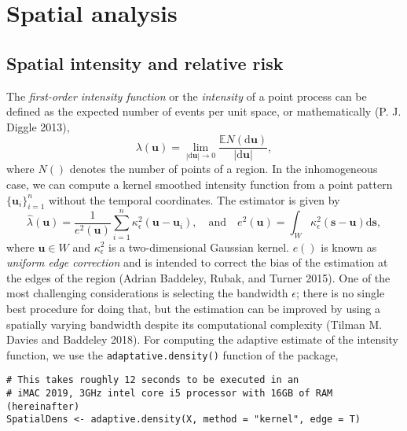 \hypertarget{spatial-analysis}{%
\section{Spatial analysis}\label{spatial-analysis}}

\hypertarget{sectionintensity}{%
\subsection{Spatial intensity and relative risk}\label{sectionintensity}}

The \emph{first-order intensity function} or the \emph{intensity} of a point process can be defined as the expected number of events per unit space, or mathematically (P. J. Diggle 2013),
\[
\lambda(\mathbf{u})=\lim_{|\text{d}\mathbf{u}|\rightarrow 0}\frac{\mathbb{E}N(\text{d}\mathbf{u})}{|\text{d}\mathbf{u}|},
\]
where \(N()\) denotes the number of points of a region. In the inhomogeneous case, we can compute a kernel smoothed intensity function from a point pattern \(\{\mathbf{u}_i\}_{i=1}^n\) without the temporal coordinates. The estimator is given by
\begin{equation}
    \hat{\lambda}(\mathbf{u})=\frac{1}{e^2(\mathbf{u})}\sum_{i=1}^{n}\kappa_{\epsilon}^{2}(\mathbf{u}-\mathbf{u}_i), \quad \text{and} \quad e^2(\mathbf{u})=\int_{W} \kappa_{\epsilon}^{2}(\mathbf{s}-\mathbf{u}) \text{d} \mathbf{s},
    \label{eq:lambdaspatial}
\end{equation}
where \(\mathbf{u}\in W\) and \(\kappa_{\epsilon}^{2}\) is a two-dimensional Gaussian kernel. \(e()\) is known as \emph{uniform edge correction} and is intended to correct the bias of the estimation at the edges of the region (Adrian Baddeley, Rubak, and Turner 2015). One of the most challenging considerations is selecting the bandwidth \(\epsilon\); there is no single best procedure for doing that, but the estimation can be improved by using a spatially varying bandwidth despite its computational complexity (Tilman M. Davies and Baddeley 2018). For computing the adaptive estimate of the intensity function, we use the \texttt{adaptative.density()} function of the  package,

\begin{verbatim}
# This takes roughly 12 seconds to be executed in an
# iMAC 2019, 3GHz intel core i5 processor with 16GB of RAM (hereinafter)
SpatialDens <- adaptive.density(X, method = "kernel", edge = T)
\end{verbatim}

